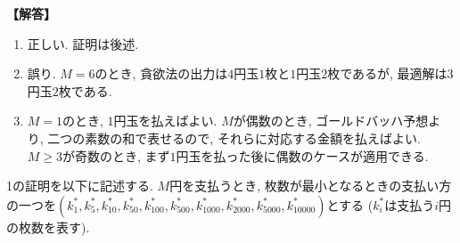 \documentclass[12pt,a4paper]{article}
\newenvironment{solution}{
    \vspace{0.5em}
    \noindent
    \textbf{【解答】}
    \vspace{0.3em}
}{
    \vspace{1em}
}
\begin{document}
\begin{solution}

\begin{enumerate}
\item 正しい. 証明は後述.
\item 誤り. $M=6$のとき, 貪欲法の出力は$4$円玉$1$枚と$1$円玉$2$枚であるが, 最適解は$3$円玉$2$枚である.
\item $M=1$のとき, $1$円玉を払えばよい. $M$が偶数のとき, ゴールドバッハ予想より, 二つの素数の和で表せるので, それらに対応する金額を払えばよい. $M\ge 3$が奇数のとき, まず$1$円玉を払った後に偶数のケースが適用できる.
\end{enumerate}

1の証明を以下に記述する. $M$円を支払うとき, 枚数が最小となるときの支払い方の一つを$(k^*_1,k^*_5,k^*_{10},k^*_{50},k^*_{100},k^*_{500}, k^*_{1000}, k^*_{2000}, k^*_{5000}, k^*_{10000})$とする ($k^*_i$は支払う$i$円の枚数を表す).


\end{solution}
\end{document}
